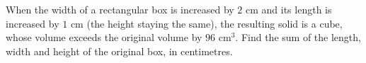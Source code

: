 When the width of a rectangular box is increased by $2$ cm and its length is increased by $1$ cm (the height staying the same), the resulting solid is a cube, whose volume exceeds the original volume by $96\text{ cm}^3$. Find the sum of the length, width and height of the original box, in centimetres.
